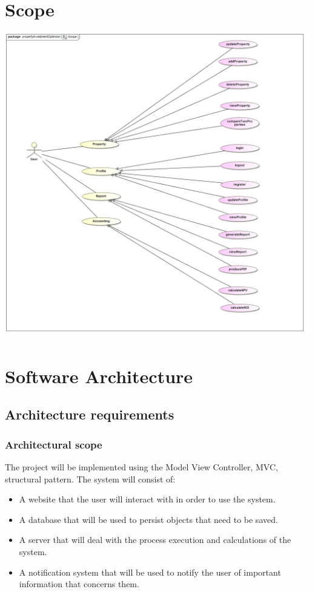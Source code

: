 \documentclass[a4paper,12pt]{article}
\begin{document}
\section{Scope}
\includegraphics[width=1\textwidth]{./Images/newDiagrams/Scope/Priscilla/Scope.jpg}

\newpage
\section{Software Architecture}
\subsection{Architecture requirements}
\subsubsection{Architectural scope}
The project will be implemented using the Model View Controller, MVC, structural pattern.
The system will consist of:\begin{itemize}
	\item A website that the user will interact with in order to use the system.
	\item A database that will be used to persist objects that need to be saved.
	\item A server that will deal with the process execution and calculations of the system.
	\item A notification system that will be used to notify the user of important information that concerns them.
\end{itemize}
\end{document}
